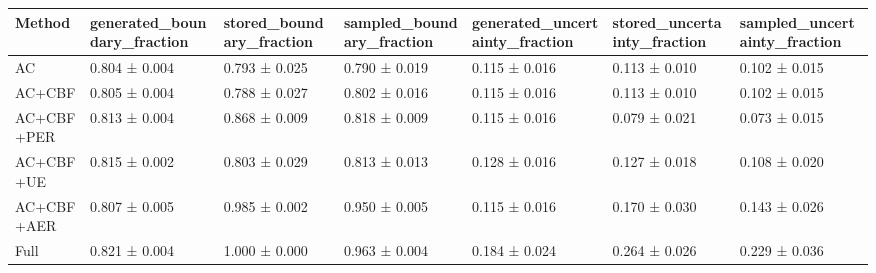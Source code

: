 \begin{tabular}{lllllll}
\toprule
Method & generated\_boundary\_fraction & stored\_boundary\_fraction & sampled\_boundary\_fraction & generated\_uncertainty\_fraction & stored\_uncertainty\_fraction & sampled\_uncertainty\_fraction \\
\midrule
AC & 0.804 ± 0.004 & 0.793 ± 0.025 & 0.790 ± 0.019 & 0.115 ± 0.016 & 0.113 ± 0.010 & 0.102 ± 0.015 \\
AC+CBF & 0.805 ± 0.004 & 0.788 ± 0.027 & 0.802 ± 0.016 & 0.115 ± 0.016 & 0.113 ± 0.010 & 0.102 ± 0.015 \\
AC+CBF+PER & 0.813 ± 0.004 & 0.868 ± 0.009 & 0.818 ± 0.009 & 0.115 ± 0.016 & 0.079 ± 0.021 & 0.073 ± 0.015 \\
AC+CBF+UE & 0.815 ± 0.002 & 0.803 ± 0.029 & 0.813 ± 0.013 & 0.128 ± 0.016 & 0.127 ± 0.018 & 0.108 ± 0.020 \\
AC+CBF+AER & 0.807 ± 0.005 & 0.985 ± 0.002 & 0.950 ± 0.005 & 0.115 ± 0.016 & 0.170 ± 0.030 & 0.143 ± 0.026 \\
Full & 0.821 ± 0.004 & 1.000 ± 0.000 & 0.963 ± 0.004 & 0.184 ± 0.024 & 0.264 ± 0.026 & 0.229 ± 0.036 \\
\bottomrule
\end{tabular}
